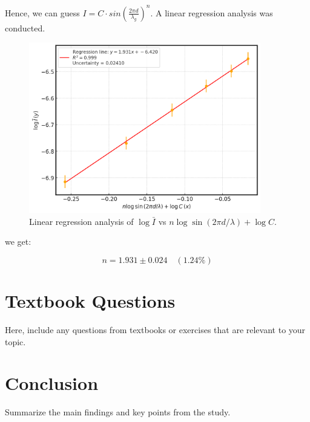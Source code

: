 \documentclass{article}
\begin{document}
Hence, we can guess $I=C\cdot sin(\frac{2\pi d}{\lambda_g})^n$. A linear regression analysis was conducted. 

\begin{figure}[H]
    \centering
    \includegraphics[width=0.9\textwidth]{./media/lab1.png}
    \caption{Linear regression analysis of $\log \bar{I}$ vs $n \log \sin\left(2 \pi d / \lambda \right) + \log C$.}
    \label{fig:regression}
\end{figure}

we get:

\[
n = 1.931 \pm 0.024 \quad (1.24\%)
\]



\section{Textbook Questions}
Here, include any questions from textbooks or exercises that are relevant to your topic.

\section{Conclusion}
Summarize the main findings and key points from the study.

\printbibliography
\end{document}
